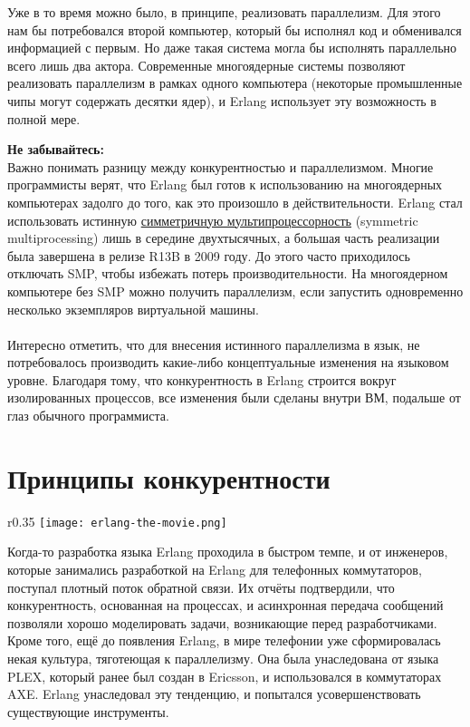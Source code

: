 Уже в то время можно было, в принципе, реализовать параллелизм.
Для этого нам бы потребовался второй компьютер, который бы исполнял код и обменивался информацией с первым.
Но даже такая система могла бы исполнять параллельно всего лишь два актора.
Современные многоядерные системы позволяют реализовать параллелизм в рамках одного компьютера (некоторые промышленные чипы могут содержать десятки ядер), и Erlang использует эту возможность в полной мере.\\
\colorbox{lorange}
{
\begin{minipage}{1.0\linewidth}
    \textbf{Не забывайтесь:}\\
    Важно понимать разницу между конкурентностью и параллелизмом.
    Многие программисты верят, что Erlang был готов к использованию на многоядерных компьютерах задолго до того, как это произошло в действительности.
    Erlang стал использовать истинную \href{http://en.wikipedia.org/wiki/Symmetric\_multiprocessing}{симметричную мультипроцессорность} (symmetric multiprocessing) лишь в середине двухтысячных, а большая часть реализации была завершена в релизе R13B в 2009 году.
    До этого часто приходилось отключать SMP, чтобы избежать потерь производительности.
    На многоядерном компьютере без SMP можно получить параллелизм, если запустить одновременно несколько экземпляров виртуальной машины.\\
    \\
    Интересно отметить, что для внесения истинного параллелизма в язык, не потребовалось производить какие\--либо концептуальные изменения на языковом уровне.
    Благодаря тому, что конкурентность в Erlang строится вокруг изолированных процессов, все изменения были сделаны внутри ВМ, подальше от глаз обычного программиста.
\end{minipage}
}
\section{Принципы конкурентности}
\label{concepts-of-concurrency}
\begin{wrapfigure}{r}{0.35\linewidth}
    \texttt{[image: erlang-the-movie.png]}
\end{wrapfigure}
Когда\--то разработка языка Erlang проходила в быстром темпе, и от инженеров, которые занимались разработкой на Erlang для телефонных коммутаторов, поступал плотный поток обратной связи.
Их отчёты подтвердили, что конкурентность, основанная на процессах, и асинхронная передача сообщений позволяли хорошо моделировать задачи, возникающие перед разработчиками.
Кроме того, ещё до появления Erlang, в мире телефонии уже сформировалась некая культура, тяготеющая к параллелизму.
Она была унаследована от языка PLEX, который ранее был создан в Ericsson, и использовался в коммутаторах AXE.
Erlang унаследовал эту тенденцию, и попытался усовершенствовать существующие инструменты.

